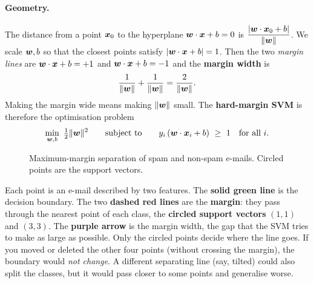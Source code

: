 \paragraph{Geometry.} The distance from a point $\boldsymbol{x}_0$ to the hyperplane $\boldsymbol{w}\cdot\boldsymbol{x}+b=0$ is $\dfrac{|\boldsymbol{w}\cdot\boldsymbol{x}_0+b|}{\|\boldsymbol{w}\|}$. We scale $\boldsymbol{w},b$ so that the closest points satisfy $|\boldsymbol{w}\cdot\boldsymbol{x}+b|=1$. Then the two \emph{margin lines} are $\boldsymbol{w}\cdot\boldsymbol{x}+b=+1$ and $\boldsymbol{w}\cdot\boldsymbol{x}+b=-1$ and the \textbf{margin width} is
\[
  \frac{1}{\|\boldsymbol{w}\|}+\frac{1}{\|\boldsymbol{w}\|}=\frac{2}{\|\boldsymbol{w}\|}.
\]
Making the margin wide means making $\|\boldsymbol{w}\|$ small. The \textbf{hard-margin SVM} is therefore the optimisation problem
\begin{equation}\label{eq:svm}
  \min_{\boldsymbol{w},b}\ \tfrac12\|\boldsymbol{w}\|^2\qquad\text{subject to}\qquad y_i\,(\boldsymbol{w}\cdot\boldsymbol{x}_i+b)\ \ge\ 1\quad\text{for all }i .
\end{equation}

\begin{figure}[!htbp]
\centering
{}
\caption{Maximum-margin separation of spam and non-spam e-mails. Circled points are the support vectors.}\label{fig:svm}
\end{figure}

\begin{explain}
Each point is an e-mail described by two features. The \textbf{solid green line} is the decision boundary. The two \textbf{dashed red lines} are the \textbf{margin}: they pass through the nearest point of each class, the \textbf{circled support vectors} $(1,1)$ and $(3,3)$. The \textbf{purple arrow} is the margin width, the gap that the SVM tries to make as large as possible. Only the circled points decide where the line goes. If you moved or deleted the other four points (without crossing the margin), the boundary would \emph{not change}. A different separating line (say, tilted) could also split the classes, but it would pass closer to some points and generalise worse.
\end{explain}

